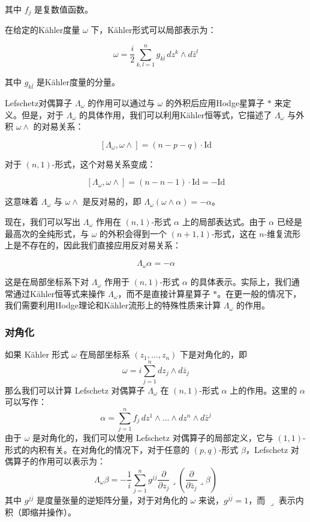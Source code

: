 其中 \(f_j\) 是复数值函数。

在给定的Kähler度量 \(\omega\) 下，Kähler形式可以局部表示为：

\[
\omega = \frac{i}{2} \sum_{k,l=1}^{n} g_{k\bar{l}} \, dz^k \wedge d\bar{z}^l
\]

其中 \(g_{k\bar{l}}\) 是Kähler度量的分量。

Lefschetz对偶算子 \(\Lambda_\omega\) 的作用可以通过与 \(\omega\) 的外积后应用Hodge星算子 \(\ast\) 来定义。但是，对于 \(\Lambda_\omega\) 的具体作用，我们可以利用Kähler恒等式，它描述了 \(\Lambda_\omega\) 与外积 \(\omega \wedge\) 的对易关系：

\[
[\Lambda_\omega, \omega \wedge] = (n - p - q) \cdot \text{Id}
\]

对于 \((n, 1)\)-形式，这个对易关系变成：

\[
[\Lambda_\omega, \omega \wedge] = (n - n - 1) \cdot \text{Id} = -\text{Id}
\]

这意味着 \(\Lambda_\omega\) 与 \(\omega \wedge\) 是反对易的，即 \(\Lambda_\omega(\omega \wedge \alpha) = -\alpha\)。

现在，我们可以写出 \(\Lambda_\omega\) 作用在 \((n, 1)\)-形式 \(\alpha\) 上的局部表达式。由于 \(\alpha\) 已经是最高次的全纯形式，与 \(\omega\) 的外积会得到一个 \((n+1, 1)\)-形式，这在 \(n\)-维复流形上是不存在的，因此我们直接应用反对易关系：

\[
\Lambda_\omega \alpha = -\alpha
\]

这是在局部坐标系下对 \(\Lambda_\omega\) 作用于 \((n, 1)\)-形式 \(\alpha\) 的具体表示。实际上，我们通常通过Kähler恒等式来操作 \(\Lambda_\omega\)，而不是直接计算星算子 \(\ast\)。在更一般的情况下，我们需要利用Hodge理论和Kähler流形上的特殊性质来计算 \(\Lambda_\omega\) 的作用。


\subsubsection{对角化}
如果 Kähler 形式 \(\omega\) 在局部坐标系 \((z_1, \ldots, z_n)\) 下是对角化的，即
\[
\omega = i \sum_{j=1}^{n} dz_j \wedge d\bar{z}_j
\]
那么我们可以计算 Lefschetz 对偶算子 \(\Lambda_\omega\) 在 \((n, 1)\)-形式 \(\alpha\) 上的作用。这里的 \(\alpha\) 可以写作：
\[
\alpha = \sum_{j=1}^{n} f_j \, dz^1 \wedge \ldots \wedge dz^n \wedge d\bar{z}^j
\]
由于 \(\omega\) 是对角化的，我们可以使用 Lefschetz 对偶算子的局部定义，它与 \((1,1)\)-形式的内积有关。在对角化的情况下，对于任意的 \((p,q)\)-形式 \(\beta\)，Lefschetz 对偶算子的作用可以表示为：
\[
\Lambda_\omega \beta = -\frac{1}{i} \sum_{j=1}^{n} g^{j\bar{j}} \frac{\partial}{\partial z_j} \lrcorner \left( \frac{\partial}{\partial \bar{z}_j} \lrcorner \beta \right)
\]
其中 \(g^{j\bar{j}}\) 是度量张量的逆矩阵分量，对于对角化的 \(\omega\) 来说，\(g^{j\bar{j}} = 1\)，而 \(\lrcorner\) 表示内积（即缩并操作）。

